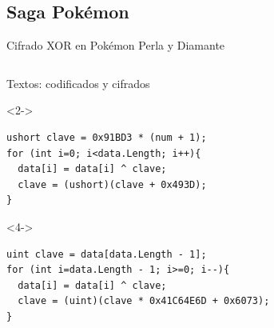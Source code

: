 \subsection{Saga Pokémon}
\begin{frame}[fragile]{Cifrado XOR en Pokémon Perla y Diamante}
\begin{columns}
\begin{column}{0.75\textwidth}
    Textos: codificados y cifrados
    \begin{uncoverenv}<2->\begin{lstlisting}
ushort clave = 0x91BD3 * (num + 1);
for (int i=0; i<data.Length; i++){
  data[i] = data[i] ^ clave;
  clave = (ushort)(clave + 0x493D);
}
    \end{lstlisting}\end{uncoverenv}

    \begin{uncoverenv}<4->\begin{lstlisting}
uint clave = data[data.Length - 1];
for (int i=data.Length - 1; i>=0; i--){
  data[i] = data[i] ^ clave;
  clave = (uint)(clave * 0x41C64E6D + 0x6073);
}
    \end{lstlisting}\end{uncoverenv}
\end{column}

\begin{column}{0.25\textwidth}
    \vfill
\end{column}
\end{columns}
\end{frame}


